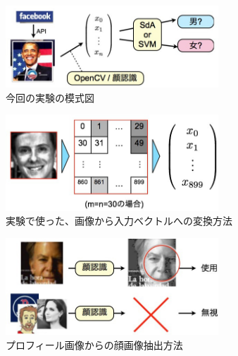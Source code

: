 \begin{figure}[tbp]
 \begin{center}
  \includegraphics[width=80mm]{img/c6/expr}
 \end{center}
 \caption{今回の実験の模式図}
 \label{c6_expr}
\end{figure}

\begin{figure}[tbp]
 \begin{center}
  \includegraphics[width=80mm]{img/c6/conv}
 \end{center}
 \caption{実験で使った、画像から入力ベクトルへの変換方法}
 \label{c6_conv}
\end{figure}

\begin{figure}[tbp]
 \begin{center}
  \includegraphics[width=80mm]{img/c6/pic_judge}
 \end{center}
 \caption{プロフィール画像からの顔画像抽出方法}
 \label{c6_pic_judge}
\end{figure}

